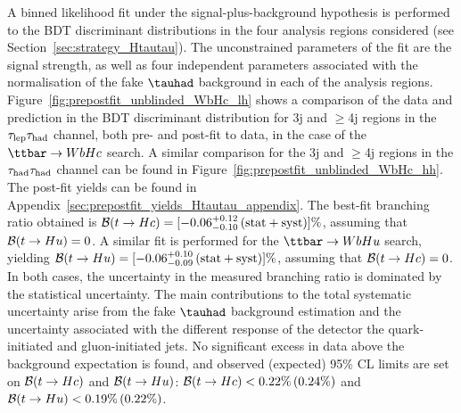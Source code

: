 A binned likelihood fit under the signal-plus-background hypothesis is performed to the BDT discriminant distributions in the four 
analysis regions considered (see Section~\ref{sec:strategy_Htautau}). The unconstrained parameters of the fit are the signal 
strength, as well as four independent parameters associated with the normalisation of the fake $\tauhad$ background in each of the analysis regions. 
Figure~\ref{fig:prepostfit_unblinded_WbHc_lh} shows a comparison of the data and prediction in the BDT discriminant distribution for 3j and $\geq$4j regions 
in the $\tau_{\mathrm{lep}} \tau_{\mathrm{had}}$ channel, both pre- and post-fit to data, in the case of the $\Hc$ search.  
A similar comparison for the 3j and $\geq$4j regions in the $\tau_{\mathrm{had}} \tau_{\mathrm{had}}$ channel can be found in Figure~\ref{fig:prepostfit_unblinded_WbHc_hh}.
The post-fit yields can be found in Appendix~\ref{sec:prepostfit_yields_Htautau_appendix}.
The best-fit branching ratio obtained is $\mathcal{B}(t\to Hc)=[-0.06^{+0.12}_{-0.10}\,(\mathrm{stat+syst})]\%$, assuming that $\mathcal{B}(t\to Hu)=0$. 
A similar fit is performed for the $\Hu$ search, yielding $\mathcal{B}(t\to Hu)=[-0.06^{+0.10}_{-0.09}\,(\mathrm{stat+syst})]\%$,
assuming that $\mathcal{B}(t\to Hc)=0$. In both cases, the uncertainty in the measured branching ratio is dominated by the statistical uncertainty.
The main contributions to the total systematic uncertainty arise from the fake $\tauhad$ background estimation and the uncertainty associated
with the different response of the detector the quark-initiated and gluon-initiated jets.
No significant excess in data above the background expectation is found, 
and observed (expected) 95\% CL limits are set on $\mathcal{B}(t\to Hc)$ and $\mathcal{B}(t\to Hu)$:
$\mathcal{B}(t\to Hc)<0.22\%\,(0.24\%)$ and $\mathcal{B}(t\to Hu)<0.19\%\,(0.22\%)$.

